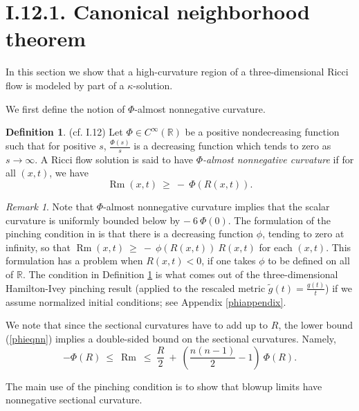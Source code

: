 \documentclass[12pt]{amsart}
\newcommand{\R}{{\mathbb R}}
\newcommand{\Rm}{\operatorname{Rm}}
\numberwithin{equation}{section}
\theoremstyle{plain}
\theoremstyle{definition}
\newtheorem{definition}[equation]{Definition}
\theoremstyle{remark}
\newtheorem{remark}[equation]{Remark}
\begin{document}
\section{I.12.1. Canonical neighborhood theorem}
\label{I.12.1}

In this section we show that a high-curvature region of a three-dimensional
Ricci flow is modeled by part of a $\kappa$-solution.


We first define the notion of $\Phi$-almost nonnegative curvature.

\begin{definition} (cf. I.12) \label{pinchingdef}
Let $\Phi \in C^\infty(\R)$ be a positive nondecreasing function 
such that
for positive $s$, $\frac{\Phi(s)}{s}$ is a decreasing function which
tends to zero as $s \rightarrow \infty$.
A Ricci flow solution is said to have {\em $\Phi$-almost nonnegative
curvature} if for all $(x,t)$, we have
\begin{equation} \label{phieqnn}
\Rm(x,t) \: \ge \: - \: \Phi(R(x,t)).
\end{equation}
\end{definition}

\begin{remark}
Note that $\Phi$-almost nonnegative curvature implies that the scalar curvature is uniformly
bounded below by $- \: 6 \: \Phi(0)$. 
The formulation of the pinching condition in \cite[Section 12]{Perelman}
is that there is a decreasing function $\phi$, tending to zero at infinity,
so that $\Rm(x,t) \: \ge \: - \: \phi(R(x,t)) \: R(x,t)$ for each
$(x,t)$. This formulation has a problem when $R(x,t) < 0$, if one
takes $\phi$ to be defined on all of $\R$. The condition in
Definition \ref{pinchingdef} is what comes out of the
three-dimensional
Hamilton-Ivey pinching result (applied to the rescaled metric
$\tilde{g}(t) = \frac{g(t)}{t}$) if we assume normalized initial
conditions; see Appendix \ref{phiappendix}.
\end{remark}

We note that since the sectional curvatures have to add up to
$R$, the lower bound (\ref{phieqnn}) implies a double-sided bound on the
sectional curvatures.  Namely,
\begin{equation} \label{double}
- \Phi(R) \: \le \:
\Rm \: \le \: \frac{R}{2} \: + \: \left( \frac{n(n-1)}{2} - 1 \right)
\: \Phi(R).
\end{equation}

The main use of the pinching condition is to show that
blowup limits have nonnegative sectional curvature.
\end{document}
